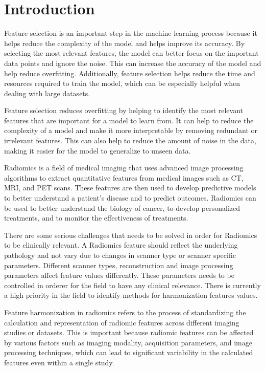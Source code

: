 \section{Introduction}

Feature selection is an important step in the machine learning process because
it helps reduce the complexity of the model and helps improve its accuracy. By
selecting the most relevant features, the model can better focus on the
important data points and ignore the noise. This can increase the accuracy of
the model and help reduce overfitting. Additionally, feature selection helps
reduce the time and resources required to train the model, which can be
especially helpful when dealing with large datasets.

Feature selection reduces overfitting by helping to identify the most relevant
features that are important for a model to learn from. It can help to reduce
the complexity of a model and make it more interpretable by removing redundant
or irrelevant features. This can also help to reduce the amount of noise in the
data, making it easier for the model to generalize to unseen data.

Radiomics is a field of medical imaging that uses advanced
image processing algorithms to extract quantitative features from medical
images such as CT, MRI, and PET scans. These features are then used to develop
predictive models to better understand a patient's disease and to predict
outcomes. Radiomics can be used to better understand the biology of cancer, to
develop personalized treatments, and to monitor the effectiveness of
treatments.

There are some serious challenges that needs to be solved in order for
Radiomics to be clinically relevant.     
A Radiomics feature should reflect the underlying pathology and not vary due to
changes in scanner type or scanner specific parameters. Different scanner
types, reconstruction and image processing parameters affect feature values
differently. These parameters needs to be controlled in orderer for the field to have any
clinical relevance. 
There is currently a high priority in the field to identify methods for
harmonization features values. 

Feature harmonization in radiomics refers to the process of standardizing the
calculation and representation of radiomic features across different imaging
studies or datasets. This is important because radiomic features can be
affected by various factors such as imaging modality, acquisition parameters,
and image processing techniques, which can lead to significant variability in
the calculated features even within a single study.

